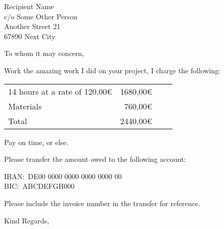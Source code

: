 \documentclass[
	11pt,
	a4paper,
	letter,
	parskip=yes,
	fromemail,
	fromphone
]{scrlttr2} %
\date{\DTMdate{2023-10-31}}
\begin{document}
\begin{letter}{%
		Recipient Name\\
		c/o Some Other Person\\
		Another Street 21\\[\medskipamount]
		67890 Next City}


	\opening{To whom it may concern,}

	Work the amazing work I did on your project, I charge the following:

	\begin{tabularx}{\textwidth}{@{}Xr@{}Xr}
		14 hours at a rate of 120,00€		&  1680,00€ \\
		Materials 											&   760,00€ \\
		\midrule
		Total														& 2440,00€ \\
		\bottomrule
	\end{tabularx}

	Pay on time, or else.

	Please transfer the amount owed to the following account:

	IBAN:\ DE00 0000 0000 0000 0000 00\\
	BIC:\ ABCDEFGH000

	Please include the invoice number in the transfer for reference.

	\closing{Kind Regards,}

\end{letter}
\end{document}

